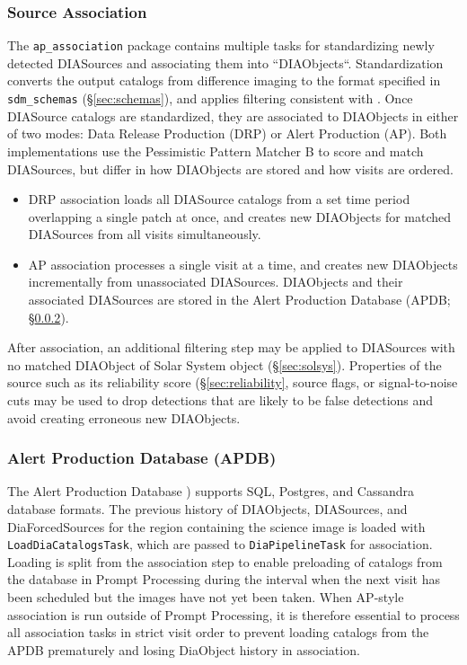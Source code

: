 \subsubsection{Source Association}
\label{sec:association}

The \texttt{ap\_association} package contains multiple tasks for standardizing newly detected DIASources and associating them into ``DIAObjects``.
Standardization converts the output catalogs from difference imaging to the format specified in \texttt{sdm\_schemas} (\S\ref{sec:schemas}), and applies filtering consistent with \citep{DMTN-199}.
Once DIASource catalogs are standardized, they are associated to DIAObjects in either of two modes: Data Release Production (DRP) or Alert Production (AP).
Both implementations use the Pessimistic Pattern Matcher B \citep{DMTN-031} to score and match DIASources, but differ in how DIAObjects are stored and how visits are ordered.

\begin{itemize}
\item DRP association loads all DIASource catalogs from a set time period overlapping a single patch at once, and creates new DIAObjects for matched DIASources from all visits simultaneously.
\item AP association processes a single visit at a time, and creates new DIAObjects incrementally from unassociated DIASources.
DIAObjects and their associated DIASources are stored in the Alert Production Database (APDB; \S\ref{sec:apdb}).
\end{itemize}

After association, an additional filtering step may be applied to DIASources with no matched DIAObject of Solar System object (\S\ref{sec:solsys}).
Properties of the source such as its reliability score (\S\ref{sec:reliability}, source flags, or signal-to-noise cuts may be used to drop detections that are likely to be false detections and avoid creating erroneous new DIAObjects.

\subsubsection{Alert Production Database (APDB)}
\label{sec:apdb}

The Alert Production Database \citep[APDB;][]{DMTN-293}) supports SQL, Postgres, and Cassandra database formats.
The previous history of DIAObjects, DIASources, and DiaForcedSources for the region containing the science image is loaded with \texttt{LoadDiaCatalogsTask}, which are passed to \texttt{DiaPipelineTask} for association.
Loading is split from the association step to enable preloading of catalogs from the database in Prompt Processing during the interval when the next visit has been scheduled but the images have not yet been taken.
When AP-style association is run outside of Prompt Processing, it is therefore essential to process all association tasks in strict visit order to prevent loading catalogs from the APDB prematurely and losing DiaObject history in association.

